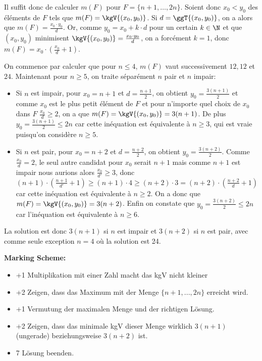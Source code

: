 \documentclass[language=german,style=solution]{smo}
\begin{document}
\begin{enumerate}[label=\textbf{\arabic*.}]
Il suffit donc de calculer $m(F)$ pour $F = \{n+1, \ldots, 2n\}$. Soient donc $x_0 < y_0$ des éléments de $F$ tels que $m(F) = \kgV{(x_0, y_0)}$. Si $d = \ggT{(x_0, y_0)}$, on a alors que $m(F) = \frac{x_0\cdot y_0}{d}$.
Or, comme $y_0 = x_0 + k\cdot d$ pour un certain $k\in \N$ et que $(x_0, y_0)$ minimisent $\kgV{(x_0, y_0)} = \frac{x_0\cdot y_0}{d}$, on a forcément $k=1$, donc $m(F) = x_0\cdot\left(\frac{x_0}{d}+1\right)$.
	
On commence par calculer que pour $n \leq 4$, $m(F)$ vaut successivement $12, 12$ et $24$. Maintenant pour $n\geq 5$, on traite séparément $n$ pair et $n$ impair:
\begin{itemize}
\item Si $n$ est impair, pour $x_0 = n+1$ et $d = \frac{n+1}{2}$, on obtient $y_0 = \frac{3(n+1)}{2}$ et comme $x_0$ est le plus petit élément de $F$ et pour n'importe quel choix de $x_0$ dans $F$ $\frac{x_0}{d} \geq 2$, on a que $m(F) = \kgV{(x_0, y_0)} = 3(n+1)$. De plus $y_0 = \frac{3(n+1)}{2} \leq 2n$ car cette inéquation est équivalente à $n\geq 3$, qui est vraie puisqu'on considère $n\geq 5$.
\item Si $n$ est pair, pour $x_0 = n+2$ et $d = \frac{n+2}{2}$, on obtient $y_0 = \frac{3(n+2)}{2}$. Comme $\frac{x_0}{d} = 2$, le seul autre candidat pour $x_0$ serait $n+1$ mais comme $n+1$ est impair nous aurions alors $\frac{x_0}{d'} \geq 3$, donc $(n+1)\cdot\left(\frac{n+1}{d'}+1\right) \geq (n+1)\cdot 4 \geq (n+2)\cdot 3 = (n+2)\cdot\left(\frac{n+2}{d}+1\right)$ car cette inéquation est équivalente à $n\geq 2$. On a donc que $m(F) = \kgV{(x_0, y_0)} = 3(n+2)$. Enfin on constate que $y_0 = \frac{3(n+2)}{2} \leq 2n$ car l'inéquation est équivalente à $n\geq 6$.
\end{itemize}
	
La solution est donc $3(n+1)$ si $n$ est impair et $3(n+2)$ si $n$ est pair, avec comme seule exception $n=4$ où la solution est 24.

\textbf{Marking Scheme:}
\begin{itemize}
\item +1 Multiplikation mit einer Zahl macht das kgV nicht kleiner
\item +2 Zeigen, dass das Maximum mit der Menge $\{n+1,...,2n\}$ erreicht wird.
\item +1 Vermutung der maximalen Menge und der richtigen Lösung.
\item +2 Zeigen, dass das minimale kgV dieser Menge wirklich $3(n+1)$ (ungerade) beziehungsweise $3(n+2)$ ist.
\item 7 Lösung beenden.
\end{itemize}


\end{enumerate}
\end{document}
